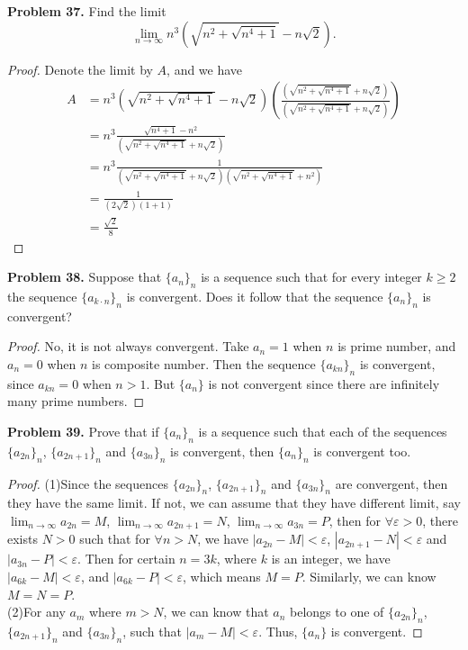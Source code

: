 \documentclass[12pt,leqno]{amsart}
\begin{document}
\medskip

\noindent
{\bf Problem 37.}
Find the limit
$$
\lim_{n\to\infty} n^3\left(\sqrt{n^2+\sqrt{n^4+1}}-n\sqrt{2}\right).
$$
\begin{proof}
Denote the limit by $A$, and we have
\begin{align*}
    A & = n^3\left(\sqrt{n^2+\sqrt{n^4+1}}-n\sqrt{2}\right) \left(\frac{(\sqrt{n^2+\sqrt{n^4+1}}+n\sqrt{2})}{(\sqrt{n^2+\sqrt{n^4+1}}+n\sqrt{2})} \right) \\
    & = n^3 \frac{\sqrt{n^4+1}-n^2}{(\sqrt{n^2+\sqrt{n^4+1}}+n\sqrt{2})} \\
    & = n^3 \frac{1}{(\sqrt{n^2+\sqrt{n^4+1}}+n\sqrt{2})(\sqrt{n^2+\sqrt{n^4+1}}+n^2)} \\
    & = \frac{1}{(2\sqrt{2})(1+1)} \\
    & = \frac{\sqrt{2}}{8}
\end{align*}

\end{proof}

\medskip

\noindent
{\bf Problem 38.}
Suppose that $\{a_n\}_n$ is a sequence such that for every integer $k\geq 2$ the sequence $\{a_{k\cdot n}\}_n$ is convergent.
Does it follow that the sequence $\{a_n\}_n$  is convergent?
\begin{proof}
No, it is not always convergent. Take $a_n=1$ when $n$ is prime number, and $a_n=0$ when $n$ is composite number. Then the sequence $\{a_{kn}\}_n$ is convergent, since $a_{kn}=0$ when $n>1$. But $\{a_n\}$ is not convergent since there are infinitely many prime numbers.
\end{proof}

\medskip

\noindent
{\bf Problem 39.}
Prove that if $\{a_n\}_n$ is a sequence such that each of the sequences $\{a_{2n}\}_n$,
$\{ a_{2n+1}\}_n$ and $\{ a_{3n}\}_n$ is convergent, then $\{ a_n\}_n$ is convergent too.
\begin{proof}
(1)Since the sequences $\{a_{2n}\}_n$, $\{ a_{2n+1}\}_n$ and $\{ a_{3n}\}_n$ are convergent, then they have the same limit. If not, we can assume that they have different limit, say $\lim_{n\to\infty} a_{2n} = M$, $\lim_{n\to\infty} a_{2n+1} = N$, $\lim_{n\to\infty} a_{3n} = P$, then for $\forall \varepsilon > 0$, there exists $N > 0$ such that for $\forall n > N$, we have $|a_{2n} - M| < \varepsilon$, $|a_{2n+1} - N| < \varepsilon$ and $|a_{3n} - P| < \varepsilon$. Then for certain $n = 3k$, where $k$ is an integer, we have $|a_{6k} - M| < \varepsilon$, and $|a_{6k} - P| < \varepsilon$, which means $M = P$. Similarly, we can know $M=N=P$. \\
\hspace*{3em}(2)For any $a_m$ where $m > N$, we can know that $a_n$ belongs to one of $\{a_{2n}\}_n$,
$\{ a_{2n+1}\}_n$ and $\{ a_{3n}\}_n$, such that $|a_m - M|<\varepsilon$. Thus, $\{a_n\}$ is convergent.
\end{proof}
\end{document}
